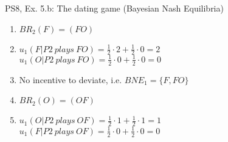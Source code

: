 \begin{frame}{PS8, Ex. 5.b: The dating game (Bayesian Nash Equilibria)}
\begin{multicols}{2}
\begin{enumerate}
        \item[1.a:] $BR_2(F)=(FO)$
        \item[1.b:] $u_1(F|P2\ plays\ FO)=\frac{1}{2}\cdot2+\frac{1}{2}\cdot0=2$\\
                    $u_1(O|P2\ plays\ FO)=\frac{1}{2}\cdot0+\frac{1}{2}\cdot0=0$
        \item[1.c:] No incentive to deviate, i.e. $BNE_1=\{F,FO\}$
        \item[2.a:] $BR_2(O)=(OF)$
        \item[2.b:] $u_1(O|P2\ plays\ OF)=\frac{1}{2}\cdot1+\frac{1}{2}\cdot1=1$\\
                    $u_1(F|P2\ plays\ OF)=\frac{1}{2}\cdot0+\frac{1}{2}\cdot0=0$
      \end{enumerate}
      \vfill\null
    \end{multicols}
\end{frame}
